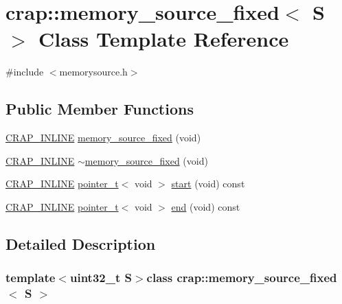 \hypertarget{classcrap_1_1memory__source__fixed}{\section{crap\+:\+:memory\+\_\+source\+\_\+fixed$<$ S $>$ Class Template Reference}
\label{classcrap_1_1memory__source__fixed}
}


{\ttfamily \#include $<$memorysource.\+h$>$}

\subsection*{Public Member Functions}
\begin{DoxyCompactItemize}
\item 
\hyperlink{config__x86_8h_a5a40526b8d842e7ff731509998bb0f1c}{C\+R\+A\+P\+\_\+\+I\+N\+L\+I\+N\+E} \hyperlink{classcrap_1_1memory__source__fixed_a40e946604622cdd7ffe49a756b87b841}{memory\+\_\+source\+\_\+fixed} (void)
\item 
\hyperlink{config__x86_8h_a5a40526b8d842e7ff731509998bb0f1c}{C\+R\+A\+P\+\_\+\+I\+N\+L\+I\+N\+E} \hyperlink{classcrap_1_1memory__source__fixed_a7493863d9c032cf76ffd809017b63a35}{$\sim$memory\+\_\+source\+\_\+fixed} (void)
\item 
\hyperlink{config__x86_8h_a5a40526b8d842e7ff731509998bb0f1c}{C\+R\+A\+P\+\_\+\+I\+N\+L\+I\+N\+E} \hyperlink{structcrap_1_1pointer__t}{pointer\+\_\+t}$<$ void $>$ \hyperlink{classcrap_1_1memory__source__fixed_a146e5e17f9ed2d17c9f8c0d972e989d4}{start} (void) const 
\item 
\hyperlink{config__x86_8h_a5a40526b8d842e7ff731509998bb0f1c}{C\+R\+A\+P\+\_\+\+I\+N\+L\+I\+N\+E} \hyperlink{structcrap_1_1pointer__t}{pointer\+\_\+t}$<$ void $>$ \hyperlink{classcrap_1_1memory__source__fixed_a60ce8ebc97fe7a92c2bb7c70ed094291}{end} (void) const 
\end{DoxyCompactItemize}


\subsection{Detailed Description}
\subsubsection*{template$<$uint32\+\_\+t S$>$class crap\+::memory\+\_\+source\+\_\+fixed$<$ S $>$}



